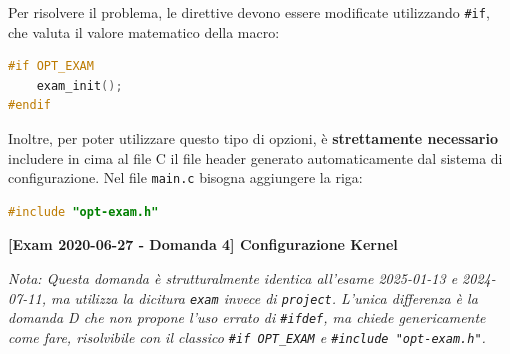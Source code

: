 Per risolvere il problema, le direttive devono essere modificate utilizzando \texttt{\#if}, che valuta il valore matematico della macro:
\begin{lstlisting}[language=C]
#if OPT_EXAM
    exam_init();
#endif
\end{lstlisting}
Inoltre, per poter utilizzare questo tipo di opzioni, è \textbf{strettamente necessario} includere in cima al file C il file header generato automaticamente dal sistema di configurazione. Nel file \texttt{main.c} bisogna aggiungere la riga:
\begin{lstlisting}[language=C]
#include "opt-exam.h"
\end{lstlisting}

\vspace{1em}

\textbf{[Exam 2020-06-27 - Domanda 4] Configurazione Kernel}

\textit{Nota: Questa domanda è strutturalmente identica all'esame 2025-01-13 e 2024-07-11, ma utilizza la dicitura \texttt{exam} invece di \texttt{project}. L'unica differenza è la domanda D che non propone l'uso errato di \texttt{\#ifdef}, ma chiede genericamente come fare, risolvibile con il classico \texttt{\#if OPT\_EXAM} e \texttt{\#include "opt-exam.h"}.}
